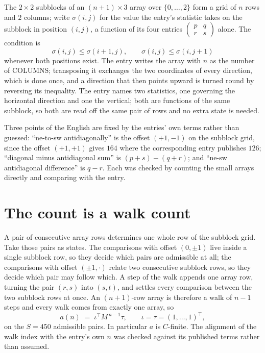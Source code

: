 \documentclass[11pt,a4paper]{article}
\theoremstyle{plain}
\theoremstyle{definition}
\begin{document}
The $2\times2$ subblocks of an $(n+1)\times3$ array over $\{0,\dots,2\}$ form a grid
of $n$ rows and $2$ columns; write $\sigma(i,j)$ for the value the entry's statistic takes on
the subblock in position $(i,j)$, a function of its four entries
$\begin{pmatrix}p&q\\r&s\end{pmatrix}$ alone. The condition is
\[
\sigma(i,j)\le\sigma(i+1,j),\qquad \sigma(i,j)\le\sigma(i,j+1)
\]
whenever both positions exist. The entry writes the array with $n$ as the number of COLUMNS; transposing it exchanges the two coordinates of every direction, which is done once, and a direction that then points upward is turned round by reversing its inequality. The entry names two statistics, one governing the horizontal direction and one the vertical; both are functions of the same subblock, so both are read off the same pair of rows and no extra state is needed.

Three points of the English are fixed by the entries' own terms rather than guessed:
``ne-to-sw antidiagonally'' is the offset $(+1,-1)$ on the subblock grid, since the offset
$(+1,+1)$ gives $164$ where the corresponding entry publishes $126$; ``diagonal minus
antidiagonal sum'' is $(p+s)-(q+r)$; and ``ne-sw antidiagonal difference'' is $q-r$. Each was
checked by counting the small arrays directly and comparing with the entry.

\section{The count is a walk count}

A pair of consecutive array rows determines one whole row of the subblock grid. Take those
pairs as states. The comparisons with offset $(0,\pm1)$ live inside a single subblock row, so
they decide which pairs are admissible at all; the comparisons with offset $(\pm1,\cdot)$
relate two consecutive subblock rows, so they decide which pair may follow which. A step of the
walk appends one array row, turning the pair $(r,s)$ into $(s,t)$, and settles every comparison
between the two subblock rows at once. An $(n+1)$-row array is therefore a walk of $n-1$ steps
and every walk comes from exactly one array, so
\[
a(n)\;=\;\iota^{\!\top}M^{\,n-1}\tau,\qquad \iota=\tau=(1,\dots,1)^{\!\top},
\]
on the $S=450$ admissible pairs. In particular $a$ is $C$-finite. The alignment of the walk
index with the entry's own $n$ was checked against its published terms rather than assumed.
\end{document}
